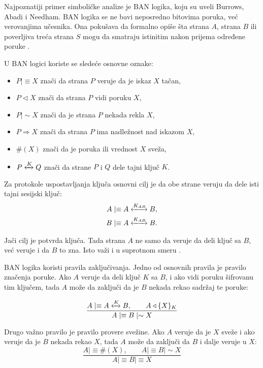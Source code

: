 Najpoznatiji primer simboličke analize je BAN logika, koju su uveli Burrows, Abadi i Needham. BAN logika se ne bavi neposredno bitovima poruka, već verovanjima učesnika. Ona pokušava da formalno opiše šta strana \(A\), strana \(B\) ili poverljiva treća strana \(S\) mogu da smatraju istinitim nakon prijema određene poruke \cite{burrows1990logic}.

U BAN logici koriste se sledeće osnovne oznake:

\begin{itemize}
\item \(P \mid\equiv X\) znači da strana \(P\) veruje da je iskaz \(X\) tačan,
\item \(P \triangleleft X\) znači da strana \(P\) vidi poruku \(X\),
\item \(P \mid\sim X\) znači da je strana \(P\) nekada rekla \(X\),
\item \(P \Rightarrow X\) znači da strana \(P\) ima nadležnost nad iskazom \(X\),
\item \(\#(X)\) znači da je poruka ili vrednost \(X\) sveža,
\item \(P \xleftrightarrow{K} Q\) znači da strane \(P\) i \(Q\) dele tajni ključ \(K\)\cite{burrows1990logic}.
\end{itemize}

Za protokole uspostavljanja ključa osnovni cilj je da obe strane veruju da dele isti tajni sesijski ključ:
\[ \begin{aligned} A &\mid\equiv A \xleftrightarrow{K_{AB}} B, \\ B &\mid\equiv A \xleftrightarrow{K_{AB}} B. \end{aligned} \]

Jači cilj je potvrda ključa. Tada strana \(A\) ne samo da veruje da deli ključ sa \(B\), već veruje i da \(B\) to zna. Isto važi i u suprotnom smeru \cite{smart2016cryptography}.

BAN logika koristi pravila zaključivanja. Jedno od osnovnih pravila je pravilo značenja poruke. Ako \(A\) veruje da deli ključ \(K\) sa \(B\), i ako vidi poruku šifrovanu tim ključem, tada \(A\) može da zaključi da je \(B\) nekada rekao sadržaj te poruke:

\[ \frac{ \displaystyle A \mid\equiv A \xleftrightarrow{K} B, \qquad A \triangleleft \{X\}_{K} }{ \displaystyle A \mid\equiv B \mid\sim X } \]

Drugo važno pravilo je pravilo provere svežine. Ako \(A\) veruje da je \(X\) sveže i ako veruje da je \(B\) nekada rekao \(X\), tada \(A\) može da zaključi da \(B\) i dalje veruje u \(X\):
\[ \frac{ \displaystyle A \mid\equiv \#(X), \qquad A \mid\equiv B \mid\sim X }{ \displaystyle A \mid\equiv B \mid\equiv X } \]


